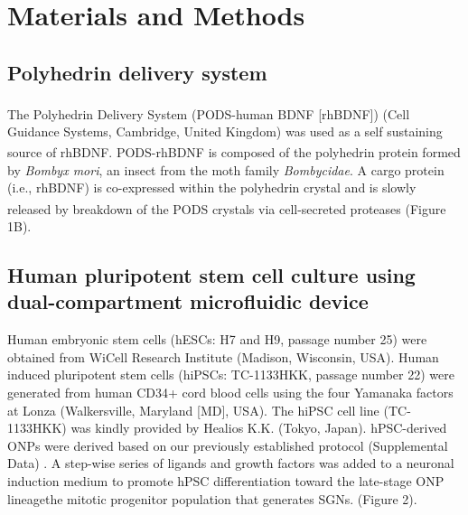 \documentclass[review]{elsarticle}
\begin{document}
\section{Materials and Methods}
\subsection{Polyhedrin delivery system}
The Polyhedrin Delivery System (PODS\textsuperscript{\textregistered}-human BDNF [rhBDNF]) (Cell Guidance Systems, Cambridge, United Kingdom) was used as a self sustaining source of rhBDNF. PODS\textsuperscript{\textregistered}-rhBDNF is composed of the polyhedrin protein formed by \textit{Bombyx mori}, an insect from the moth family \textit{Bombycidae}. A cargo protein (i.e., rhBDNF) is co-expressed within the polyhedrin crystal and is slowly released by breakdown of the PODS\textsuperscript{\textregistered} crystals via cell-secreted proteases (Figure 1B)\cite{Chang2020, Suzuki1997, Guo2017}. 

\subsection{Human pluripotent stem cell culture using dual-compartment microfluidic device}
Human embryonic stem cells (hESCs: H7 and H9, passage number 25) were obtained from WiCell Research Institute (Madison, Wisconsin, USA). Human induced pluripotent stem cells (hiPSCs:  TC-1133HKK, passage number 22) were generated from human CD34+ cord blood cells using the four Yamanaka factors at Lonza (Walkersville, Maryland [MD], USA). The hiPSC cell line (TC-1133HKK) was kindly provided by Healios K.K. (Tokyo, Japan). hPSC-derived ONPs were derived based on our previously established protocol (Supplemental Data) \cite{Heuer2021,Chang2020, Matsuoka2017g, Matsuoka2017}. A step-wise series of ligands and growth factors was added to a neuronal induction medium to promote hPSC differentiation toward the late-stage ONP lineage\textemdash the mitotic progenitor population that generates SGNs. (Figure 2).
\end{document}

